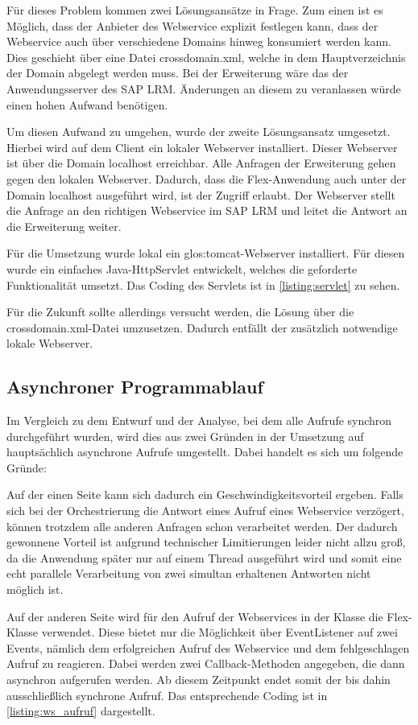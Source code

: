 \begin{onehalfspacing}
Für dieses Problem kommen zwei Lösungsansätze in Frage. Zum einen ist es Möglich, dass der Anbieter des Webservice explizit festlegen kann, dass der Webservice auch über verschiedene Domains hinweg konsumiert werden kann. Dies geschieht über eine Datei crossdomain.xml, welche in dem Hauptverzeichnis der Domain abgelegt werden muss. Bei der Erweiterung wäre das der Anwendungsserver des SAP LRM. Änderungen an diesem zu veranlassen würde einen hohen Aufwand benötigen. 

Um diesen Aufwand zu umgehen, wurde der zweite Lösungsansatz umgesetzt. Hierbei wird auf dem Client ein lokaler Webserver installiert. Dieser Webserver ist über die Domain localhost erreichbar. Alle Anfragen der Erweiterung gehen gegen den lokalen Webserver. Dadurch, dass die Flex-Anwendung auch unter der Domain localhost ausgeführt wird, ist der Zugriff erlaubt. Der Webserver stellt die Anfrage an den richtigen Webservice im SAP LRM und leitet die Antwort an die Erweiterung weiter.

Für die Umsetzung wurde lokal ein \gls{glos:tomcat}-Webserver installiert. Für diesen wurde ein einfaches Java-HttpServlet entwickelt, welches die geforderte Funktionalität umsetzt. Das Coding des Servlets ist in \vref{listing:servlet} zu sehen.

Für die Zukunft sollte allerdings versucht werden, die Lösung über die crossdomain.xml-Datei umzusetzen. Dadurch entfällt der zusätzlich notwendige lokale Webserver.

\subsection{Asynchroner Programmablauf}
\label{sec:asynchron}
Im Vergleich zu dem Entwurf und der Analyse, bei dem alle Aufrufe synchron durchgeführt wurden, wird dies aus zwei Gründen in der Umsetzung auf hauptsächlich asynchrone Aufrufe umgestellt. Dabei handelt es sich um folgende Gründe:

Auf der einen Seite kann sich dadurch ein Geschwindigkeitsvorteil ergeben. Falls sich bei der Orchestrierung die Antwort eines Aufruf eines Webservice verzögert, können trotzdem alle anderen Anfragen schon verarbeitet werden. Der dadurch gewonnene Vorteil ist aufgrund technischer Limitierungen leider nicht allzu groß, da die Anwendung später nur auf einem Thread ausgeführt wird und somit eine echt parallele Verarbeitung von zwei simultan erhaltenen Antworten nicht möglich ist. %

Auf der anderen Seite wird für den Aufruf der Webservices in der Klasse  die Flex-Klasse  verwendet. Diese bietet nur die Möglichkeit über EventListener auf zwei Events, nämlich dem erfolgreichen Aufruf des Webservice und dem fehlgeschlagen Aufruf zu reagieren. Dabei werden zwei Callback-Methoden angegeben, die dann asynchron aufgerufen werden. Ab diesem Zeitpunkt endet somit der bis dahin ausschließlich synchrone Aufruf. Das entsprechende Coding ist in \vref{listing:ws_aufruf} dargestellt.


\end{onehalfspacing}
